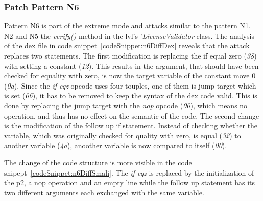 \subsubsection{Patch Pattern N6}
Pattern N6 is part of the extreme mode and attacks similar to the pattern N1, N2 and N5 the \textit{verify()} method in the \gls{lvl}'s '\textit{LivenseValidator} class.
\newline
The analysis of the \gls{dex} file in code snippet~\ref{codeSnippet:n6DiffDex} reveals that the attack replaces two statements.
The first modification is replacing the if equal zero (\textit{38}) with setting a constant (\textit{12}).
This results in the argument, that should have been checked for equality with zero, is now the target variable of the constant move 0 (\textit{0a}).
Since the \textit{if-eqz} opcode uses four touples, one of them is jump target which is set (\textit{06}), it has to be removed to keep the syntax of the dex code valid.
This is done by replacing the jump target with the \textit{nop} opcode (\textit{00}), which means no operation, and thus has no effect on the semantic of the code.
The second change is the modification of the follow up if statement.
Instead of checking whether the variable, which was originally checked for quality with zero, is equal (\textit{32}) to another variable (\textit{4a}), anoother variable is now compared to itself (\textit{00}).
\newline

The change of the code structure is more visible in the code snipept~\ref{codeSnippet:n6DiffSmali}.
The \textit{if-eqz} is replaced by the initialization of the p2, a nop operation and an empty line while the follow up statement has its two different arguments each exchanged with the same variable.
\newline


